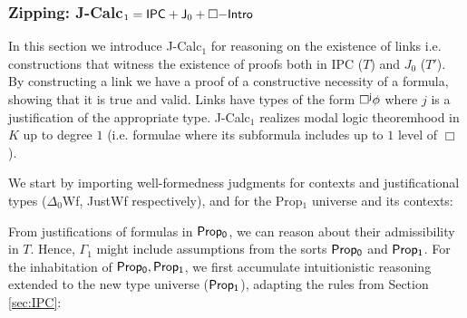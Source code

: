 \subsubsection{Zipping: {\sf J-Calc}$_1={\sf IPC}+ {\sf J}_0+\Box{\sf-Intro}$}\label{sec:jcalc1}
In this section we introduce {\sf J-Calc$_1$} for reasoning on the existence of  links i.e. constructions that witness the existence of proofs both in {\sf IPC} ($T$) and {\sf $J_0$} ($T'$). By constructing a link we have a proof of a constructive necessity of a formula, showing that it is true and valid. Links have types of the form ${\sf\Box^{j}\phi}$ where $j$ is a justification of the appropriate type. {\sf J-Calc$_1$} realizes modal logic theoremhood in $K$ up to degree $1$ (i.e. formulae where its subformula includes up to $1$ level of $\Box$). 

We start by importing well-formedness judgments for contexts and justificational types ($\Delta_0$Wf, JustWf respectively), and for the Prop$_{1}$ universe and its contexts: 

\bigskip

From justifications of formulas in ${\sf Prop_0}$, we can reason about their admissibility in $T$. Hence, $\Gamma_1$ might include assumptions from the sorts ${\sf Prop_0}$ and ${\sf Prop_1}$. For the inhabitation of ${\sf Prop_0, Prop_1}$, we first accumulate intuitionistic reasoning extended to the new type universe (${\sf Prop_1}$), adapting the rules from Section \ref{sec:IPC}:
\bigskip


